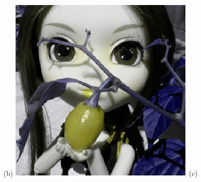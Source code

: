 \documentclass[	12pt, Times, openright, twoside, a4paper, english, brazil]{abntex2}
\begin{document}
\begin{figure}[!htb]
(b)
\endminipage\hfill
{}
\centering
{\includegraphics[width=\linewidth]{figuraPimenta120Deutran.png}}
(c)
\endminipage\hfill



\end{figure}
\end{document}
